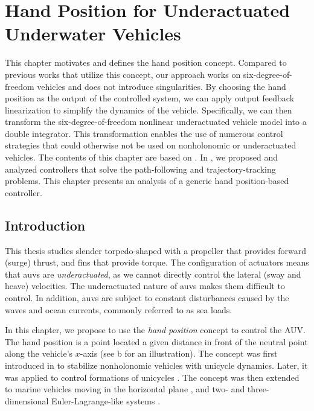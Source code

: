 \chapter{Hand Position for Underactuated Underwater Vehicles}
\label{chap:handpos_definition}

This chapter motivates and defines the hand position concept.
Compared to previous works that utilize this concept, our approach works on six-degree-of-freedom vehicles and does not introduce singularities.
By choosing the hand position as the output of the controlled system, we can apply output feedback linearization to simplify the dynamics of the vehicle.
Specifically, we can then transform the six-degree-of-freedom nonlinear underactuated vehicle model into a double integrator.
This transformation enables the use of numerous control strategies that could otherwise not be used on nonholonomic or underactuated vehicles.
The contents of this chapter are based on \cite{matous_trajectory_2023}.
In \cite{matous_distributed_2023}, we proposed and analyzed controllers that solve the path-following and trajectory-tracking problems.
This chapter presents an analysis of a generic hand position-based controller.

\section{Introduction}

This thesis studies slender torpedo-shaped  with a propeller that provides forward (surge) thrust, and fins that provide torque.
The configuration of actuators means that \glspl{auv} are \emph{underactuated}, as we cannot directly control the lateral (sway and heave) velocities.
The underactuated nature of \glspl{auv} makes them difficult to control.
In addition, \glspl{auv} are subject to constant disturbances caused by the waves and ocean currents, commonly referred to as sea loads.

In this chapter, we propose to use the \emph{hand position} concept to control the AUV.
The hand position is a point located a given distance in front of the neutral point along the vehicle's $x$-axis (see b for an illustration).
The concept was first introduced in \cite{pomet_hand-position_1992} to stabilize nonholonomic vehicles with unicycle dynamics.
Later, it was applied to control formations of unicycles \cite{lawton_hand-position-formation_2003}.
The concept was then extended to marine vehicles moving in the horizontal plane \cite{paliotta_trajectory_2019}, and two- and three-dimensional Euler-Lagrange-like systems \cite{cai_hand-position-rigidity-planar_2015,li_hand-position-rigidity-3d_2021}.

